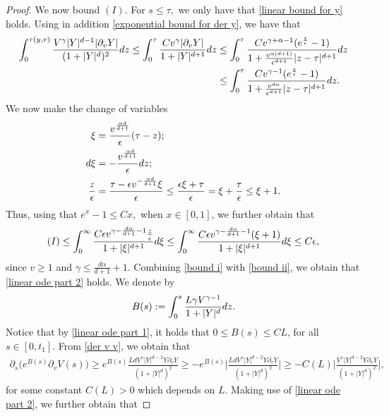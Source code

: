 \documentclass[10pt,a4paper]{amsart}
\newcommand{\der}{\textup{d}}
\begin{document}
\begin{proof}
We now bound $(I)$. For $s\leq \tau,$ we only have that \eqref{linear bound for y} holds. Using in addition \eqref{exponential bound for der y}, we have that 
\begin{align*}
    \int_{0}^{\tau(y,v)}\frac{V^{\gamma}|Y|^{d-1}|\partial_{v}Y|} {(1+|Y|^{d})^{2}}\der z\leq   \int_{0}^{\tau}\frac{Cv^{\gamma}|\partial_{v}Y|}{1+|Y|^{d+1}}\der z&\leq \int_{0}^{\tau}\frac{C v^{\gamma+\alpha-1}(e^{\frac{z}{\epsilon}}-1)}{1+\frac{v^{\alpha(d+1)}}{\epsilon^{d+1}}|z-\tau|^{d+1}}\der z\\
    &\leq \int_{0}^{\tau}\frac{C v^{\gamma-1}(e^{\frac{z}{\epsilon}}-1)}{1+\frac{v^{d\alpha}}{\epsilon^{d+1}}|z-\tau|^{d+1}}\der z.
\end{align*}
We now make the change of variables 
\begin{align*}
    \xi&=\frac{v^{\frac{\alpha d}{d+1}}}{\epsilon}(\tau-z);\\
     \der \xi&=-\frac{v^{\frac{\alpha d}{d+1}}}{\epsilon}\der z;\\
     \frac{z}{\epsilon}&=\frac{\tau-\epsilon v^{-\frac{\alpha d}{d+1}}\xi}{\epsilon}\leq \frac{\epsilon \xi +\tau}{\epsilon}= \xi+\frac{\tau}{\epsilon}\leq\xi+1.
\end{align*}
Thus, using that $e^{x}-1\leq Cx,$ when $x\in[0,1]$, we further obtain that
\begin{align}\label{bound i}
    (I)\leq \int_{0}^{\infty}\frac{C\epsilon v^{\gamma-\frac{d\alpha}{d+1}-1}\frac{z}{\epsilon}}{1+|\xi|^{d+1}}\der \xi\leq \int_{0}^{\infty}\frac{C\epsilon v^{\gamma-\frac{d\alpha}{d+1}-1}(\xi+1)}{1+|\xi|^{d+1}}\der \xi\leq C\epsilon,
\end{align}
since $v\geq 1$ and $\gamma\leq \frac{d\alpha}{d+1}+1$. Combining \eqref{bound i} with \eqref{bound ii}, we obtain that \eqref{linear ode part 2} holds.
We denote by 
\begin{align*}
    B(s):=\int_{0}^{s}\frac{L\gamma V^{\gamma-1}}{1+|Y|^{d}}\der z.
\end{align*}
Notice that by \eqref{linear ode part 1}, it holds that $0\leq B(s)\leq CL$, for all $s\in[0,t_{1}]$.
From \eqref{der v v}, we obtain that
\begin{align*}
    \partial_{s}\big(e^{B(s)}\partial_{v}V(s)\big)\geq e^{B(s)}\frac{LdV^{\gamma}|Y|^{d-2}Y\partial_{v}Y}{(1+|Y|^{d})^{2}}\geq -e^{B(s)}\bigg|\frac{LdV^{\gamma}|Y|^{d-2}Y\partial_{v}Y}{(1+|Y|^{d})^{2}}\bigg|\geq -C(L)\bigg|\frac{V^{\gamma}|Y|^{d-2}Y\partial_{v}Y}{(1+|Y|^{d})^{2}}\bigg|,
\end{align*}
for some constant $C(L)>0$ which depends on $L$. Making use of \eqref{linear ode part 2}, we further obtain that

\end{proof}
\end{document}
